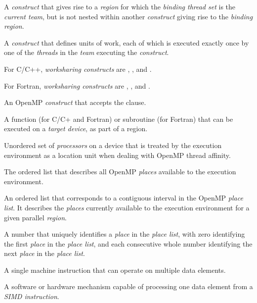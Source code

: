 \glossarydefstart
A \emph{construct} that gives rise to a \emph{region} for which the \emph{binding thread set} is the \emph{current
team}, but is not nested within another \emph{construct} giving rise to the \emph{binding region}.
\glossarydefend

\glossarydefstart
A \emph{construct} that defines units of work, each of which is executed exactly once by
one of the \emph{threads} in the \emph{team} executing the \emph{construct}.

For C/C++, \emph{worksharing constructs} are , , and .

For Fortran, \emph{worksharing constructs} are , ,  and
.
\glossarydefend

\glossarydefstart
An OpenMP \emph{construct} that accepts the  clause.
\glossarydefend

\glossarydefstart
A function (for C/C+ and Fortran) or subroutine (for Fortran) that can be
executed on a \emph{target device}, as part of a  region.
\glossarydefend

\glossarydefstart
Unordered set of \emph{processors} on a device that is treated by the execution environment as a
location unit when dealing with OpenMP thread affinity.
\glossarydefend

\glossarydefstart
The ordered list that describes all OpenMP \emph{places} available to the execution
environment.
\glossarydefend

\glossarydefstart
An ordered list that corresponds to a contiguous interval in the OpenMP \emph{place list}.
It describes the \emph{places} currently available to the execution environment for a given
parallel \emph{region}.
\glossarydefend

\glossarydefstart
A number that uniquely identifies a \emph{place} in the \emph{place list}, with zero identifying the first \emph{place} in the \emph{place list}, and each consecutive whole number identifying the next \emph{place} in the \emph{place list}.
\glossarydefend

\glossarydefstart
A single machine instruction that can operate on multiple data elements.
\glossarydefend

\glossarydefstart
A software or hardware mechanism capable of processing one data element from a
\emph{SIMD instruction}.
\glossarydefend

